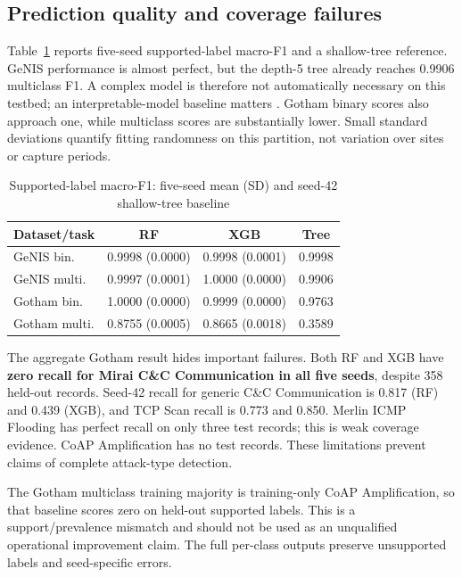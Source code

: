 \documentclass[conference,letterpaper]{IEEEtran}
\begin{document}
\subsection{Prediction quality and coverage failures}
Table~\ref{tab:prediction} reports five-seed supported-label macro-F1 and a shallow-tree reference. GeNIS performance is almost perfect, but the depth-5 tree already reaches 0.9906 multiclass F1. A complex model is therefore not automatically necessary on this testbed; an interpretable-model baseline matters \cite{rudin}. Gotham binary scores also approach one, while multiclass scores are substantially lower. Small standard deviations quantify fitting randomness on this partition, not variation over sites or capture periods.
\begin{table}[t]\centering
\caption{Supported-label macro-F1: five-seed mean (SD) and seed-42 shallow-tree baseline}
\label{tab:prediction}
\footnotesize
\setlength{\tabcolsep}{3pt}\renewcommand{\arraystretch}{1.12}
\begin{tabular}{lccc}\toprule
Dataset/task & RF & XGB & Tree \\\midrule
GeNIS bin. & 0.9998 (0.0000) & 0.9998 (0.0001) & 0.9998 \\
GeNIS multi. & 0.9997 (0.0001) & 1.0000 (0.0000) & 0.9906 \\
Gotham bin. & 1.0000 (0.0000) & 0.9999 (0.0000) & 0.9763 \\
Gotham multi. & 0.8755 (0.0005) & 0.8665 (0.0018) & 0.3589 \\
\bottomrule\end{tabular}
\end{table}
The aggregate Gotham result hides important failures. Both RF and XGB have \textbf{zero recall for Mirai C\&C Communication in all five seeds}, despite 358 held-out records. Seed-42 recall for generic C\&C Communication is 0.817 (RF) and 0.439 (XGB), and TCP Scan recall is 0.773 and 0.850. Merlin ICMP Flooding has perfect recall on only three test records; this is weak coverage evidence. CoAP Amplification has no test records. These limitations prevent claims of complete attack-type detection.

The Gotham multiclass training majority is training-only CoAP Amplification, so that baseline scores zero on held-out supported labels. This is a support/prevalence mismatch and should not be used as an unqualified operational improvement claim. The full per-class outputs preserve unsupported labels and seed-specific errors.
\end{document}
